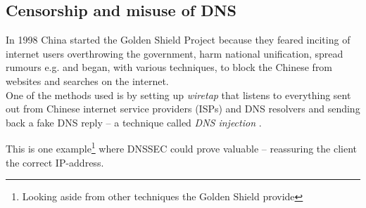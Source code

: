 \documentclass[Preamble]{subfiles}
\begin{document}
\subsection{Censorship and misuse of DNS}


In 1998 China started the Golden Shield Project because they feared inciting of internet users overthrowing the government, harm national unification, spread rumours e.g.\cite{GFW-avoid} and began, with various techniques, to block the Chinese from websites and searches on the internet.
\\
One of the methods used is by setting up \textit{wiretap} that listens to everything sent out from Chinese internet service providers (ISPs) and DNS resolvers and sending back a fake DNS reply -- a technique called \textit{DNS injection} \cite{GFW}. 


This is one example\footnote{Looking aside from other techniques the Golden Shield provide} where DNSSEC could prove valuable -- reassuring the client the correct IP-address.
\end{document}
